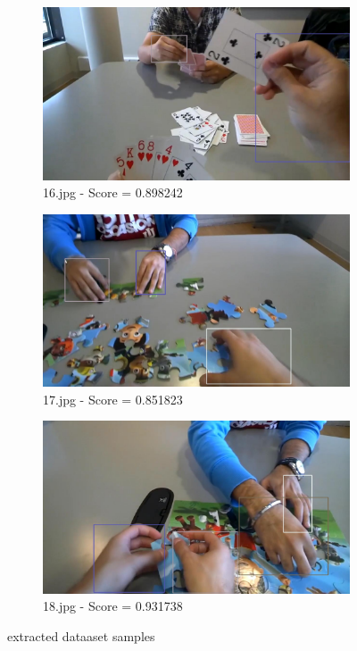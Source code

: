 \begin{figure}
    \centering
    \begin{subfigure}[b]{0.3 \textwidth}
        \centering
        \includegraphics[width=\textwidth]{images/handDetection/16.jpg}
        \caption{16.jpg - Score = 0.898242}
        
    \end{subfigure}
    \hfill
    \begin{subfigure}[b]{0.3\textwidth}
        \centering
        \includegraphics[width=\textwidth]{images/handDetection/17.jpg}
        \caption{17.jpg - Score = 0.851823}
        
    \end{subfigure}
    \begin{subfigure}[b]{0.3\textwidth}
        \centering
        \includegraphics[width=\textwidth]{images/handDetection/18.jpg}
        \caption{18.jpg - Score = 0.931738}
        
    \end{subfigure}
       \caption{extracted dataaset samples}
       
\end{figure}
